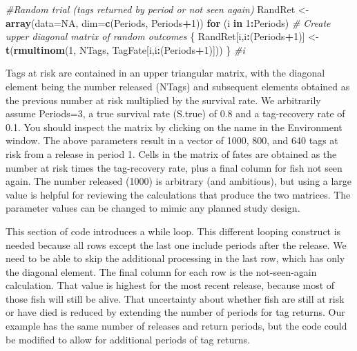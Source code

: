 \documentclass[
]{krantz}
\makeatletter
\newenvironment{Shaded}{\begin{snugshade}}{\end{snugshade}}
\newcommand{\AttributeTok}[1]{\textcolor[rgb]{0.27,0.27,0.27}{#1}}
\newcommand{\CommentTok}[1]{\textcolor[rgb]{0.37,0.37,0.37}{\textit{#1}}}
\newcommand{\ConstantTok}[1]{\textcolor[rgb]{0.37,0.37,0.37}{#1}}
\newcommand{\ControlFlowTok}[1]{\textcolor[rgb]{0.27,0.27,0.27}{\textbf{#1}}}
\newcommand{\DecValTok}[1]{\textcolor[rgb]{0.06,0.06,0.06}{#1}}
\newcommand{\FunctionTok}[1]{\textcolor[rgb]{0.27,0.27,0.27}{\textbf{#1}}}
\newcommand{\NormalTok}[1]{#1}
\newcommand{\OtherTok}[1]{\textcolor[rgb]{0.37,0.37,0.37}{#1}}
\newcommand{\SpecialCharTok}[1]{\textcolor[rgb]{0.43,0.43,0.43}{\textbf{#1}}}
\newenvironment{kframe}{%
\medskip{}
\setlength{\fboxsep}{.8em}
 \def\at@end@of@kframe{}%
 \ifinner\ifhmode%
  \def\at@end@of@kframe{\end{minipage}}%
  \begin{minipage}{\columnwidth}%
 \fi\fi%
 \def\FrameCommand##1{\hskip\@totalleftmargin \hskip-\fboxsep
 \colorbox{shadecolor}{##1}\hskip-\fboxsep
     \hskip-\linewidth \hskip-\@totalleftmargin \hskip\columnwidth}%
 \MakeFramed {\advance\hsize-\width
   \@totalleftmargin\z@ \linewidth\hsize
   \@setminipage}}%
 {\par\unskip\endMakeFramed%
 \at@end@of@kframe}
\renewenvironment{Shaded}{\begin{kframe}}{\end{kframe}}
\makeatother
\begin{document}
\begin{Shaded}
\begin{Highlighting}[]
\CommentTok{\#Random trial (tags returned by period or not seen again)}
\NormalTok{RandRet }\OtherTok{\textless{}{-}} \FunctionTok{array}\NormalTok{(}\AttributeTok{data=}\ConstantTok{NA}\NormalTok{, }\AttributeTok{dim=}\FunctionTok{c}\NormalTok{(Periods, Periods}\SpecialCharTok{+}\DecValTok{1}\NormalTok{))}
  \ControlFlowTok{for}\NormalTok{ (i }\ControlFlowTok{in} \DecValTok{1}\SpecialCharTok{:}\NormalTok{Periods) }\CommentTok{\# Create upper diagonal matrix of random outcomes}
\NormalTok{  \{}
\NormalTok{    RandRet[i,i}\SpecialCharTok{:}\NormalTok{(Periods}\SpecialCharTok{+}\DecValTok{1}\NormalTok{)] }\OtherTok{\textless{}{-}} \FunctionTok{t}\NormalTok{(}\FunctionTok{rmultinom}\NormalTok{(}\DecValTok{1}\NormalTok{, NTags, TagFate[i,i}\SpecialCharTok{:}\NormalTok{(Periods}\SpecialCharTok{+}\DecValTok{1}\NormalTok{)]))}
\NormalTok{  \} }\CommentTok{\#i}
\end{Highlighting}
\end{Shaded}

Tags at risk are contained in an upper triangular matrix, with the diagonal element being the number released (NTags) and subsequent elements obtained as the previous number at risk multiplied by the survival rate. We arbitrarily assume Periods=3, a true survival rate (S.true) of 0.8 and a tag-recovery rate of 0.1. You should inspect the matrix by clicking on the name in the Environment window. The above parameters result in a vector of 1000, 800, and 640 tags at risk from a release in period 1. Cells in the matrix of fates are obtained as the number at risk times the tag-recovery rate, plus a final column for fish not seen again. The number released (1000) is arbitrary (and ambitious), but using a large value is helpful for reviewing the calculations that produce the two matrices. The parameter values can be changed to mimic any planned study design.

This section of code introduces a while loop. This different looping construct is needed because all rows except the last one include periods after the release. We need to be able to skip the additional processing in the last row, which has only the diagonal element. The final column for each row is the not-seen-again calculation. That value is highest for the most recent release, because most of those fish will still be alive. That uncertainty about whether fish are still at risk or have died is reduced by extending the number of periods for tag returns. Our example has the same number of releases and return periods, but the code could be modified to allow for additional periods of tag returns.
\end{document}

